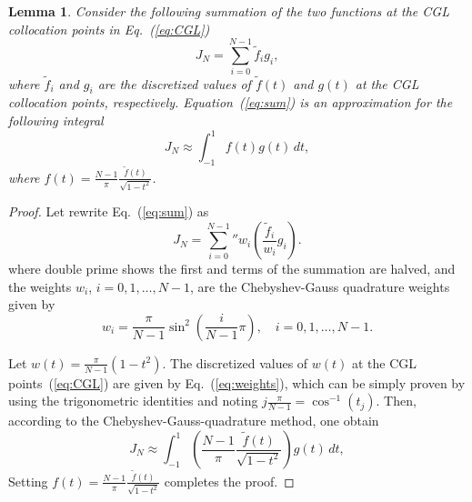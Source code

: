 \documentclass[journal]{IEEEtran}
\newtheorem{lem}{Lemma}
\newcommand{\parp}[1]{\left({#1}\right)}
\begin{document}
\begin{lem}
	Consider the following summation of the two functions at the CGL collocation points in Eq.~(\ref{eq:CGL})
	\begin{equation}\label{eq:sum}
		J_N=\sum_{i=0}^{N-1} \tilde f_i g_i,
	\end{equation}
	where $ \tilde f_i $ and $ g_i $ are the discretized values of $ \tilde f(t) $ and $ g(t) $ at the CGL collocation points, respectively.
	Equation~(\ref{eq:sum}) is an approximation for the following integral
	\begin{equation}\label{key}
		J_N \approx\int _{-1}^{1}f(t)g(t)\,dt,
	\end{equation}
	where $ f(t)=\frac{N-1}{\pi}\frac{\tilde f(t)}{\sqrt{1-t^2}} $.

\end{lem}


\begin{proof}
	Let rewrite Eq.~(\ref{eq:sum})  as
	\begin{equation}\label{eq:JN}
		J_N={\sum_{i=0}^{N-1}}'' w_i \parp{\frac{\tilde f_i}{w_i} g_i}.
	\end{equation}
	where double prime shows the first and terms of the summation are halved, and the weights $ w_i $, $i=0,1,\ldots,N-1  $, are the Chebyshev-Gauss quadrature weights given by
	\begin{equation}\label{eq:weights}
		w_{i}={\frac {\pi }{N-1}}\sin ^{2}\left({\frac {i}{N-1}}\pi \right), \quad i=0,1,\ldots,N-1.
	\end{equation}

	Let $ w(t)={\frac {\pi }{N-1}} \parp {1-t^{2}}$. The discretized values of $ w(t) $ at the CGL points~(\ref{eq:CGL}) are given by Eq.~(\ref{eq:weights}), which can be simply proven by using the  trigonometric identities and noting $ j\frac{\pi}{N-1}= \cos^{-1}(t_j ) $. Then, according to the Chebyshev-Gauss-quadrature method, one obtain
	\begin{equation}\label{key}
		J_N\approx \int _{-1}^{1}\parp{\frac{N-1}{\pi}\frac{\tilde f(t)}{\sqrt{1-t^2}} }g(t)\,dt ,
	\end{equation}
	Setting $ f(t)=\frac{N-1}{\pi}\frac{\tilde f(t)}{\sqrt{1-t^2}} $ completes the proof.

\end{proof}
\end{document}
